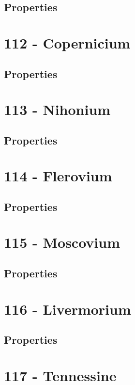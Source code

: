 \documentclass{book}
\begin{document}
\subsection{Properties}

\section{112 - Copernicium}
\label{sec:elem-copernicium}
\subsection{Properties}

\section{113 - Nihonium}
\label{sec:elem-nihonium}
\subsection{Properties}

\section{114 - Flerovium}
\label{sec:elem-flerovium}
\subsection{Properties}

\section{115 - Moscovium}
\label{sec:elem-moscovium}
\subsection{Properties}

\section{116 - Livermorium}
\label{sec:elem-livermorium}
\subsection{Properties}

\section{117 - Tennessine}
\label{sec:elem-tennessine}
\end{document}
